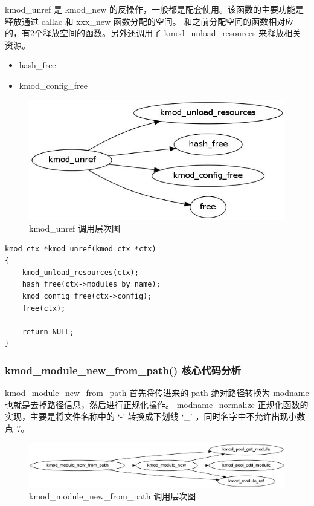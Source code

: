\documentclass[11pt,a4paper]{article}
\makeatletter
\def\maxwidth{\ifdim\Gin@nat@width>\linewidth\linewidth
\else\Gin@nat@width\fi}
\let\Oldincludegraphics\includegraphics
\renewcommand{\includegraphics}[1]{\Oldincludegraphics[width=\maxwidth]{#1}}
\makeatother
\begin{document}
kmod\_unref 是 kmod\_new
的反操作，一般都是配套使用。该函数的主要功能是释放通过 callac 和 xxx\_new
函数分配的空间。
和之前分配空间的函数相对应的，有2个释放空间的函数。另外还调用了
kmod\_unload\_resources 来释放相关资源。

\begin{itemize}
\item
  hash\_free
\item
  kmod\_config\_free
\end{itemize}
\begin{figure}[htbp]
\centering
\includegraphics{./figures/kmod_unref.jpg}
\caption{kmod\_unref 调用层次图}
\end{figure}

{\begin{shaded}\begin{verbatim}
kmod_ctx *kmod_unref(kmod_ctx *ctx)
{
    kmod_unload_resources(ctx);
    hash_free(ctx->modules_by_name);
    kmod_config_free(ctx->config);
    free(ctx);

    return NULL;
}
\end{verbatim}\end{shaded}}
\subsubsection{kmod\_module\_new\_from\_path() 核心代码分析}

kmod\_module\_new\_from\_path 首先将传进来的 path 绝对路径转换为 modname
也就是去掉路径信息，然后进行正规化操作。 modname\_normalize
正规化函数的实现，主要是将文件名称中的 `-' 转换成下划线 `\_'
，同时名字中不允许出现小数点 '.'。

\begin{figure}[htbp]
\centering
\includegraphics{./figures/kmod_module_new_from_path.jpg}
\caption{kmod\_module\_new\_from\_path 调用层次图}
\end{figure}
\end{document}
